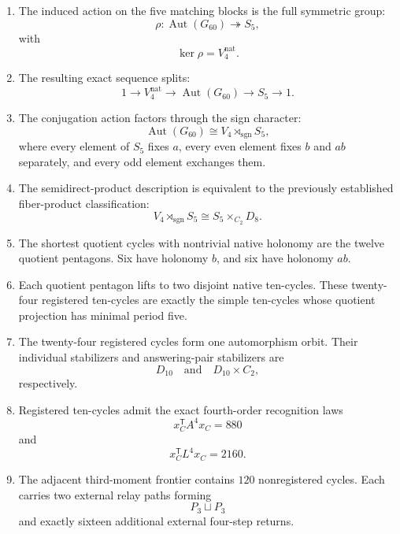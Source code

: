 \begin{theorem}
\begin{enumerate}
    \item The induced action on the five matching blocks is the full
    symmetric group:
    \[
    \rho:
    \operatorname{Aut}(G_{60})
    \twoheadrightarrow
    S_5,
    \]
    with
    \[
    \ker\rho
    =
    V_4^{\mathrm{nat}}.
    \]

    \item The resulting exact sequence splits:
    \[
    1
    \longrightarrow
    V_4^{\mathrm{nat}}
    \longrightarrow
    \operatorname{Aut}(G_{60})
    \longrightarrow
    S_5
    \longrightarrow
    1.
    \]

    \item The conjugation action factors through the sign character:
    \[
    \operatorname{Aut}(G_{60})
    \cong
    V_4\rtimes_{\operatorname{sgn}}S_5,
    \]
    where every element of \(S_5\) fixes \(a\), every even element
    fixes \(b\) and \(ab\) separately, and every odd element
    exchanges them.

    \item The semidirect-product description is equivalent to the
    previously established fiber-product classification:
    \[
    V_4\rtimes_{\operatorname{sgn}}S_5
    \cong
    S_5\times_{C_2}D_8.
    \]

    \item The shortest quotient cycles with nontrivial native
    holonomy are the twelve quotient pentagons. Six have holonomy
    \(b\), and six have holonomy \(ab\).

    \item Each quotient pentagon lifts to two disjoint native
    ten-cycles. These twenty-four registered ten-cycles are exactly
    the simple ten-cycles whose quotient projection has minimal
    period five.

    \item The twenty-four registered cycles form one automorphism
    orbit. Their individual stabilizers and answering-pair
    stabilizers are
    \[
    D_{10}
    \quad\text{and}\quad
    D_{10}\times C_2,
    \]
    respectively.

    \item Registered ten-cycles admit the exact fourth-order
    recognition laws
    \[
    x_C^{\mathsf T}A^4x_C=880
    \]
    and
    \[
    x_C^{\mathsf T}L^4x_C=2160.
    \]

    \item The adjacent third-moment frontier contains \(120\)
    nonregistered cycles. Each carries two external relay paths
    forming
    \[
    P_3\sqcup P_3
    \]
    and exactly sixteen additional external four-step returns.


\end{enumerate}
\end{theorem}
